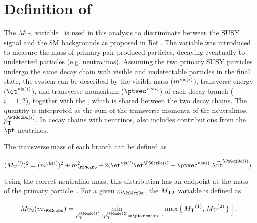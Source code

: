 \section{\texorpdfstring{Definition of \mttwo}{Definition of MT2}}
\label{sect:mt2def}
The ${M_{\rm T2}}$ variable~\cite{Lester:1999tx,Barr:2003rg} is used in this analysis to discriminate between the SUSY signal and the SM backgrounds as proposed in Ref \cite{Barr:2009wu}. The variable was introduced to measure the mass of primary pair-produced particles, decaying eventually to undetected particles (e.g. neutralinos). Assuming the two primary SUSY particles undergo the same decay chain with visible and undetectable particles in the final state, the system can be described by the visible mass ($m^{{\rm vis}(i)}$), transverse energy ($\etvisi$), and transverse momentum ($\vptvisi$) of each decay branch ($i=1,2$), together with the 
\ptvecmiss, which is shared between the two decay chains. The quantity \ptvecmiss is interpreted as the \pt sum of the transverse momenta
of the neutralinos, $\vec{p}_{\rm T}^{\PSGczDo(i)}$.
In decay chains with neutrinos, \ptvecmiss also includes contributions from the $\pt$ neutrinos.

The transverse mass of each branch can be defined as 
\begin{linenomath}
\begin{equation}
\label{eq:mtdef}
(\mt^{(i)})^{2}= (\mvisi)^2+m^2_{\PSGczDo}+2(\etvisi\et^{\PSGczDo(i)}-{\vptvisi}.\,{\vec{\pt}^{\PSGczDo(i)}}).
\end{equation}
\end{linenomath}

\noindent Using the correct neutralino mass, this distribution has an endpoint at the mass of the primary particle~\cite{Affolder:2000bpa,Abazov:2002bu}. 
For a given $m_{\PSGczDo}$, the ${M_{\rm T2}}$ variable is defined as
\begin{linenomath}
\begin{equation}
\label{eq:mt2def}
\mttwo(m_{\PSGczDo})=\min_{\vec{p}_{\rm T}^{\PSGczDo(1)}+\vec{p}_{\rm T}^{\PSGczDo(2)}=\ptvecmiss}\,\left[\,\max\,\{ \, \mt^{(1)},\,\mt^{(2)}\,\}\,\right].
\end{equation}
\end{linenomath}

